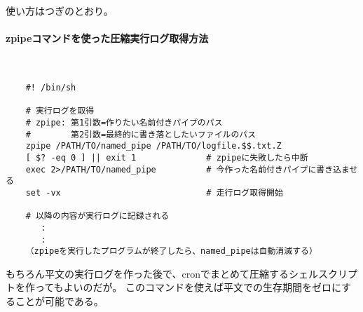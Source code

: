 使い方はつぎのとおり。
\paragraph{zpipeコマンドを使った圧縮実行ログ取得方法} 　\\
\begin{frameboxit}{160.0mm}
\begin{verbatim}
	#! /bin/sh
	
	# 実行ログを取得
	# zpipe: 第1引数=作りたい名前付きパイプのパス
	#        第2引数=最終的に書き落としたいファイルのパス
	zpipe /PATH/TO/named_pipe /PATH/TO/logfile.$$.txt.Z
	[ $? -eq 0 ] || exit 1              # zpipeに失敗したら中断
	exec 2>/PATH/TO/named_pipe          # 今作った名前付きパイプに書き込ませる
	set -vx                             # 走行ログ取得開始

	# 以降の内容が実行ログに記録される
	   :
	   :
	（zpipeを実行したプログラムが終了したら、named_pipeは自動消滅する）
\end{verbatim}
\end{frameboxit}
もちろん平文の実行ログを作った後で、cronでまとめて圧縮するシェルスクリプトを作ってもよいのだが。
このコマンドを使えば平文での生存期間をゼロにすることが可能である。
